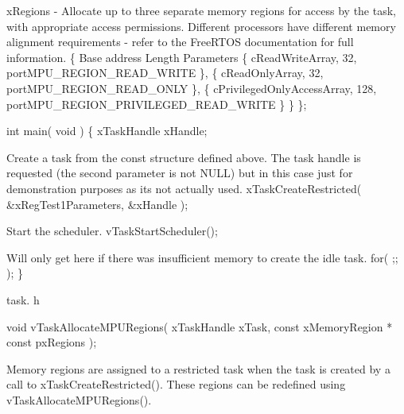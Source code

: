 \begin{DoxyPre}xRegions - Allocate up to three separate memory regions for access by
the task, with appropriate access permissions.  Different processors have
different memory alignment requirements - refer to the FreeRTOS documentation
for full information.
        \{
Base address                                    Length  Parameters
        \{ cReadWriteArray,                              32,             portMPU\_REGION\_READ\_WRITE \},
        \{ cReadOnlyArray,                               32,             portMPU\_REGION\_READ\_ONLY \},
        \{ cPrivilegedOnlyAccessArray,   128,    portMPU\_REGION\_PRIVILEGED\_READ\_WRITE \}
        \}
\};\end{DoxyPre}



\begin{DoxyPre}int main( void )
\{
xTaskHandle xHandle;\end{DoxyPre}



\begin{DoxyPre}Create a task from the const structure defined above.  The task handle
is requested (the second parameter is not NULL) but in this case just for
demonstration purposes as its not actually used.
        xTaskCreateRestricted( &xRegTest1Parameters, &xHandle );\end{DoxyPre}



\begin{DoxyPre}Start the scheduler.
        vTaskStartScheduler();\end{DoxyPre}



\begin{DoxyPre}Will only get here if there was insufficient memory to create the idle
task.
        for( ;; );
\}
   \end{DoxyPre}


task. h 
\begin{DoxyPre}
 void vTaskAllocateMPURegions( xTaskHandle xTask, const xMemoryRegion * const pxRegions );\end{DoxyPre}


Memory regions are assigned to a restricted task when the task is created by a call to x\-Task\-Create\-Restricted(). These regions can be redefined using v\-Task\-Allocate\-M\-P\-U\-Regions().


